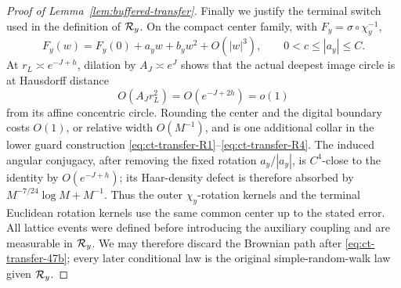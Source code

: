 \begin{proof}[Proof of Lemma~\ref{lem:buffered-transfer}]
Finally we justify the terminal switch used in the definition of
${\cal R}_y$.  On the compact center family, with
$F_y=\sigma\circ\chi_y^{-1}$,
\[
F_y(w)=F_y(0)+a_yw+b_yw^2+O(|w|^3),
       \qquad0<c\le|a_y|\le C.
\]
At $r_L\asymp e^{-J+h}$, dilation by $A_J\asymp e^J$ shows that
the actual deepest image circle is at Hausdorff distance
\begin{equation}
O(A_Jr_L^2)=O(e^{-J+2h})=o(1)\label{eq:ct-transfer-47c}
\end{equation}
from its affine concentric circle.  Rounding the center and the digital
boundary costs $O(1)$, or relative width $O(M^{-1})$, and is one
additional collar in the lower guard construction \eqref{eq:ct-transfer-R1}--\eqref{eq:ct-transfer-R4}.  The induced
angular conjugacy, after removing the fixed rotation
$a_y/|a_y|$, is $C^4$-close to the identity by
$O(e^{-J+h})$; its Haar-density defect is therefore absorbed by
$M^{-7/24}\log M+M^{-1}$.  Thus the outer $\chi_y$-rotation kernels
and the terminal Euclidean rotation kernels use the same common center
up to the stated error.  All lattice
events were defined before introducing the auxiliary coupling and are
measurable in ${\cal R}_y$.  We may therefore discard the Brownian
path after \eqref{eq:ct-transfer-47b}; every later conditional law is the original
simple-random-walk law given ${\cal R}_y$.
\end{proof}
